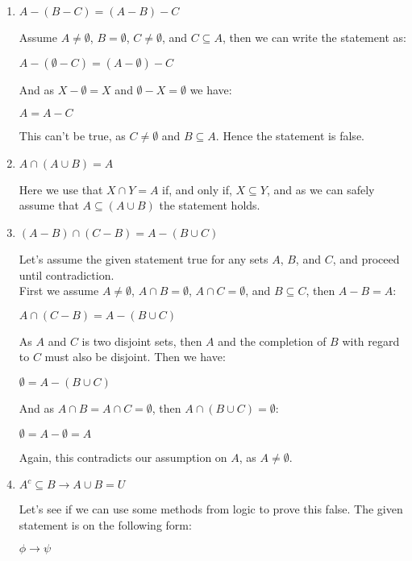 \documentclass{article}
\newcommand{\cent}[1]{\begin{center}#1\end{center}}
\begin{document}
 	\begin{enumerate}
 		\item $ A - (B - C) = (A-B)-C $
 		
 		Assume $A\neq \emptyset$, $B = \emptyset$, $C \neq \emptyset$, and $C \subseteq A$, then we can write the statement as:
 		
 		\cent{$A - (\emptyset - C) = (A-\emptyset)-C$}
 		
 		And as $X - \emptyset = X$ and $\emptyset - X = \emptyset$ we have:
 		
 		\cent{$A = A-C$}
 		
 		This can't be true, as $C \neq \emptyset$ and $B \subseteq A$. Hence the statement is false.
 		
 		\item $ A \cap (A \cup B) = A $
 		
 		Here we use that $X \cap Y = A$ if, and only if, $X \subseteq Y$,  and as we can safely assume that $A \subseteq (A \cup B)$
 		the statement holds.
 		
 		\item $ (A-B) \cap (C-B) = A - (B \cup C)  $
 		
 		Let's assume the given statement true for any sets $A$, $B$, and $C$, and proceed until contradiction.\\
 		
 		First we assume $A \neq \emptyset$, $A \cap B = \emptyset$, $ A \cap C = \emptyset $, and $B \subseteq C$, then $A-B = A$:
 		
 		\cent{$ A \cap (C-B) = A - (B \cup C)  $}
 		
 		As $A$ and $C$ is two disjoint sets, then $A$ and the completion of $B$ with regard to $C$ must also be disjoint. Then we have:
 		
 		\cent{$ \emptyset = A - (B \cup C)  $}
 		
 		And as $A \cap B = A \cap C = \emptyset$, then $A \cap (B \cup C) = \emptyset$: 		
 		
 		\cent{$ \emptyset = A - \emptyset = A  $}
 		
 		Again, this contradicts our assumption on $A$, as $A \neq \emptyset$.\\
 		
 		\item $ A^c \subseteq B \to A \cup B = U $
 		
 		Let's see if we can use some methods from logic to prove this false. The given statement is on the following form:
 		
 		\cent{$\phi \to \psi$}
 		

\end{enumerate}
\end{document}
